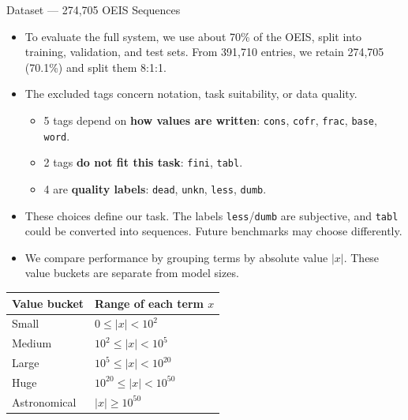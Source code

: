 \documentclass[aspectratio=169,10pt]{beamer}
\newcommand{\tightlist}{\setlength{\itemsep}{0.2em}}
\newcommand{\readout}[1]{\textcolor{readoutblue}{{\mdseries #1}}}
\begin{document}
\begin{frame}{Dataset --- 274{,}705 OEIS Sequences}
\footnotesize
\setlength{\parskip}{0pt}
  \begin{itemize}\tightlist
    \item \readout{To evaluate the full system, we use about 70\% of the OEIS, split into training, validation, and test sets.}
          From 391{,}710 entries, we retain \alert{274{,}705 (70.1\%)} and split them 8:1:1.
    \item \readout{The excluded tags concern notation, task suitability, or data quality.}
      \begin{itemize}
        \item 5 tags depend on \textbf{how values are written}:
              \texttt{cons}, \texttt{cofr}, \texttt{frac}, \texttt{base}, \texttt{word}.
        \item 2 tags \textbf{do not fit this task}: \texttt{fini}, \texttt{tabl}.
        \item 4 are \textbf{quality labels}:
              \texttt{dead}, \texttt{unkn}, \texttt{less}, \texttt{dumb}.
      \end{itemize}
    \item These choices define our task. The labels \texttt{less}/\texttt{dumb} are subjective,
          and \texttt{tabl} could be converted into sequences. Future benchmarks may choose differently.
          \hyperlink{backup-oeis-representation}{}
    \item \readout{We compare performance by grouping terms by absolute value $|x|$.}
          These value buckets are separate from model sizes.
  \end{itemize}
  {\centering\footnotesize\setlength{\tabcolsep}{12pt}\renewcommand{\arraystretch}{0.95}
  \begin{tabular}{@{}ll@{}}
    \toprule
    \textbf{Value bucket} & \textbf{Range of each term $x$} \\
    \midrule
    Small        & $0 \le |x| < 10^2$ \\
    Medium       & $10^2 \le |x| < 10^5$ \\
    Large        & $10^5 \le |x| < 10^{20}$ \\
    Huge         & $10^{20} \le |x| < 10^{50}$ \\
    Astronomical & $|x| \ge 10^{50}$ \\
    \bottomrule
  \end{tabular}\par}
\end{frame}
\end{document}
